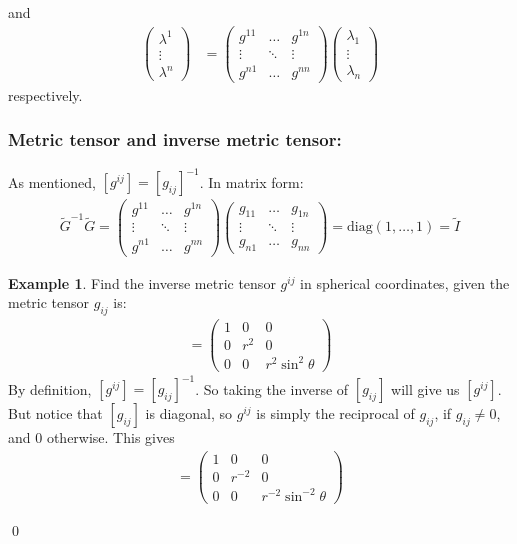 \documentclass{book}
\theoremstyle{definition}
\newtheorem{exmp}{Example}[section]
\begin{document}
and
\begin{align*}
\begin{pmatrix}
\lambda^1 \\
\vdots\\
\lambda^n
\end{pmatrix}
&=
\begin{pmatrix}
g^{11} & \dots & g^{1n}\\
\vdots & \ddots & \vdots\\
g^{n1} & \dots & g^{nn}
\end{pmatrix}
\begin{pmatrix}
\lambda_1\\
\vdots\\
\lambda_n
\end{pmatrix}
\end{align*}
respectively.\\
\subsubsection{Metric tensor and inverse metric tensor:}
As mentioned, $[g^{ij}] = [g_{ij}]^{-1}$. In matrix form:
\begin{align*}
\boxed{
\tilde{G}^{-1}\tilde{G} = 
\begin{pmatrix}
g^{11} & \dots & g^{1n}\\
\vdots & \ddots & \vdots \\
g^{n1} & \dots & g^{nn}
\end{pmatrix}
\begin{pmatrix}
g_{11} & \dots & g_{1n}\\
\vdots & \ddots & \vdots\\
g_{n1} & \dots & g_{nn}
\end{pmatrix}
=
\text{diag}(1,\dots,1) 
=
\tilde{I}
}
\end{align*}
\begin{exmp}
Find the inverse metric tensor $g^{ij}$ in spherical coordinates, given the metric tensor $g_{ij}$ is:
\begin{align*}
[g_{ij}] = 
\begin{pmatrix}
1 & 0 & 0\\
0 & r^2 & 0\\ 
0 & 0 & r^2\sin^2\theta 
\end{pmatrix}
\end{align*}
By definition, $[g^{ij}] = [g_{ij}]^{-1}$. So taking the inverse of $[g_{ij}]$ will give us $[g^{ij}]$. But notice that $[g_{ij}]$ is diagonal, so $g^{ij}$ is simply the reciprocal of $g_{ij}$, if $g_{ij} \neq 0$, and $0$ otherwise. This gives
\begin{align*}
[g^{ij}] = 
\begin{pmatrix}
1 & 0 & 0 \\
0 & r^{-2} & 0\\
0 & 0 & r^{-2}\sin^{-2}\theta
\end{pmatrix}
\end{align*}
\end{exmp}\qed
\end{document}
